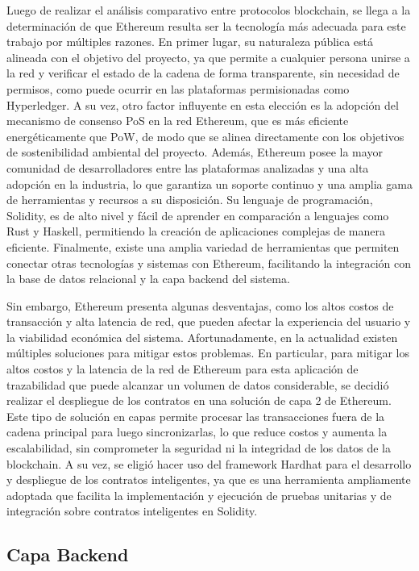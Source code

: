 Luego de realizar el análisis comparativo entre protocolos blockchain, se llega a la determinación de que Ethereum resulta ser la tecnología más adecuada para este trabajo por múltiples razones. En primer lugar, su naturaleza pública está alineada con el objetivo del proyecto, ya que permite a cualquier persona unirse a la red y verificar el estado de la cadena de forma transparente, sin necesidad de permisos, como puede ocurrir en las plataformas permisionadas como Hyperledger. A su vez, otro factor influyente en esta elección es la adopción del mecanismo de consenso PoS en la red Ethereum, que es más eficiente energéticamente que PoW, de modo que se alinea directamente con los objetivos de sostenibilidad ambiental del proyecto. Además, Ethereum posee la mayor comunidad de desarrolladores entre las plataformas analizadas y una alta adopción en la industria, lo que garantiza un soporte continuo y una amplia gama de herramientas y recursos a su disposición. Su lenguaje de programación, Solidity, es de alto nivel y fácil de aprender en comparación a lenguajes como Rust y Haskell, permitiendo la creación de aplicaciones complejas de manera eficiente. Finalmente, existe una amplia variedad de herramientas que permiten conectar otras tecnologías y sistemas con Ethereum, facilitando la integración con la base de datos relacional y la capa backend del sistema.

Sin embargo, Ethereum presenta algunas desventajas, como los altos costos de transacción y alta latencia de red, que pueden afectar la experiencia del usuario y la viabilidad económica del sistema. Afortunadamente, en la actualidad existen múltiples soluciones para mitigar estos problemas. En particular, para mitigar los altos costos y la latencia de la red de Ethereum para esta aplicación de trazabilidad que puede alcanzar un volumen de datos considerable, se decidió realizar el despliegue de los contratos en una solución de capa 2 de Ethereum. Este tipo de solución en capas permite procesar las transacciones fuera de la cadena principal para luego sincronizarlas, lo que reduce costos y aumenta la escalabilidad, sin comprometer la seguridad ni la integridad de los datos de la blockchain. A su vez, se eligió hacer uso del framework Hardhat para el desarrollo y despliegue de los contratos inteligentes, ya que es una herramienta ampliamente adoptada que facilita la implementación y ejecución de pruebas unitarias y de integración sobre contratos inteligentes en Solidity.

\subsection{Capa Backend}

